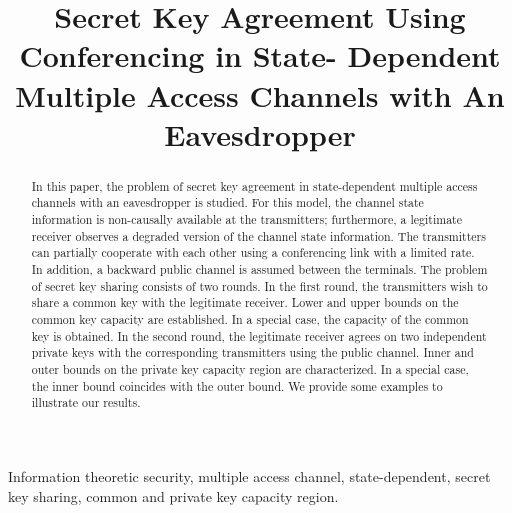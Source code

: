 \documentclass[conference,8pt]{IEEEtran}
\begin{document}
\title{Secret Key Agreement Using Conferencing in State- Dependent Multiple Access Channels with An Eavesdropper
}
\author{
}














\maketitle


\begin{abstract}
In this paper, the problem of secret key agreement in  state-dependent multiple access channels with an eavesdropper is studied. For this model, the channel state information is non-causally available at the transmitters; furthermore, a legitimate receiver observes a degraded version of the channel state information. The transmitters can partially cooperate with each other using a conferencing link with a limited rate. In addition, a backward public channel is assumed between the terminals. The problem of secret key sharing consists of two rounds. In the first round, the transmitters wish to share a common key with the legitimate receiver. Lower and upper bounds on the common key capacity are established. In a special case, the capacity of the common key is obtained. In the second round, the legitimate receiver agrees on two independent private keys with the corresponding transmitters using the public channel. Inner and outer bounds on the private key capacity region are characterized. In a special case, the inner bound coincides with the outer bound. We provide some examples to illustrate our results. \\
\end{abstract} 


\begin{keywords}
Information theoretic security, multiple access channel, state-dependent, secret key sharing, common and private key capacity region. \\
\end{keywords}
\end{document}

